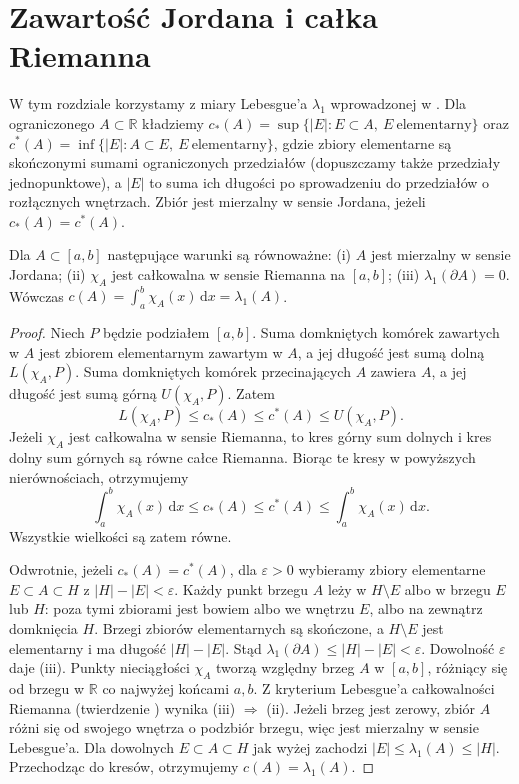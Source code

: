 \section{Zawartość Jordana i całka Riemanna}

W tym rozdziale korzystamy z miary Lebesgue'a $\lambda_1$ wprowadzonej w .
Dla ograniczonego $A\subset\mathbb{R}$ kładziemy $c_*(A)=\sup\{|E|:E\subset A,\ E\ \text{elementarny}\}$ oraz $c^*(A)=\inf\{|E|:A\subset E,\ E\ \text{elementarny}\}$, gdzie zbiory elementarne są skończonymi sumami ograniczonych przedziałów (dopuszczamy także przedziały jednopunktowe), a $|E|$ to suma ich długości po sprowadzeniu do przedziałów o rozłącznych wnętrzach. Zbiór jest mierzalny w sensie Jordana, jeżeli $c_*(A)=c^*(A)$.
\begin{twierdzenie}\label{it:thm:jordan-criterion}
Dla $A\subset[a,b]$ następujące warunki są równoważne: (i) $A$ jest mierzalny w sensie Jordana; (ii) $\chi_A$ jest całkowalna w sensie Riemanna na $[a,b]$; (iii) $\lambda_1(\partial A)=0$. Wówczas $c(A)=\int_a^b\chi_A(x)\,\mathrm dx=\lambda_1(A)$.
\end{twierdzenie}
\begin{proof}
Niech $P$ będzie podziałem $[a,b]$. Suma domkniętych komórek zawartych w $A$ jest zbiorem elementarnym zawartym w $A$, a jej długość jest sumą dolną $L(\chi_A,P)$. Suma domkniętych komórek przecinających $A$ zawiera $A$, a jej długość jest sumą górną $U(\chi_A,P)$. Zatem
\[
 L(\chi_A,P)\le c_*(A)\le c^*(A)\le U(\chi_A,P).
\]
Jeżeli $\chi_A$ jest całkowalna w sensie Riemanna,
to kres górny sum dolnych i kres dolny sum górnych
są równe całce Riemanna. Biorąc te kresy w powyższych
nierównościach, otrzymujemy
\[
 \int_a^b\chi_A(x)\,\mathrm dx
 \le c_*(A)\le c^*(A)
 \le\int_a^b\chi_A(x)\,\mathrm dx.
\]
Wszystkie wielkości są zatem równe.

Odwrotnie, jeżeli $c_*(A)=c^*(A)$, dla $\varepsilon>0$ wybieramy zbiory elementarne $E\subset A\subset H$ z $|H|-|E|<\varepsilon$. Każdy punkt brzegu $A$ leży w $H\setminus E$ albo w brzegu $E$ lub $H$: poza tymi zbiorami jest bowiem albo we wnętrzu $E$, albo na zewnątrz domknięcia $H$. Brzegi zbiorów elementarnych są skończone, a $H\setminus E$ jest elementarny i ma długość $|H|-|E|$. Stąd $\lambda_1(\partial A)\le |H|-|E|<\varepsilon$. Dowolność $\varepsilon$ daje (iii).
Punkty nieciągłości $\chi_A$ tworzą względny brzeg $A$ w $[a,b]$, różniący się od brzegu w $\mathbb{R}$ co najwyżej końcami $a,b$. Z kryterium Lebesgue'a całkowalności Riemanna (twierdzenie ) wynika (iii) $\Rightarrow$ (ii).
Jeżeli brzeg jest zerowy, zbiór $A$ różni się od swojego wnętrza o podzbiór brzegu, więc jest mierzalny w sensie Lebesgue'a. Dla dowolnych $E\subset A\subset H$ jak wyżej zachodzi $|E|\le\lambda_1(A)\le |H|$. Przechodząc do kresów, otrzymujemy $c(A)=\lambda_1(A)$.
\end{proof}
